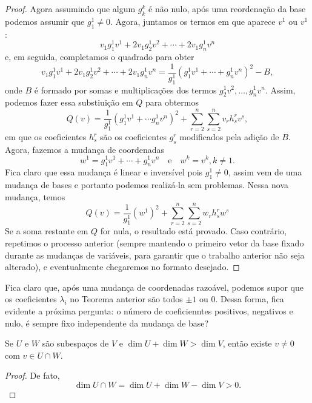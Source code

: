 \begin{proof}
    Agora assumindo que algum $g^k_k$ é não nulo, após uma reordenação da base podemos assumir que $g^1_1 \neq 0$. Agora, juntamos os termos em que aparece $v^1$ ou $v^1$: \begin{equation}
        v_1 g^1_1 v^1 + 2v_1g^1_2v^2 + \cdots + 2v_1 g^1_n v^n
    \end{equation} e, em seguida, completamos o quadrado para obter \begin{equation}
        v_1 g^1_1 v^1 + 2v_1g^1_2v^2 + \cdots + 2v_1 g^1_n v^n = \frac{1}{g^1_1}(g^1_1 v^1 + \cdots + g^1_n v^n)^2 - B,
    \end{equation} onde $B$ é formado por somas e multiplicações dos termos $g^1_2 v^2, \dots, g^1_n v^n$. Assim, podemos fazer essa substiuição em $Q$ para obtermos \begin{equation}
        Q(v) = \frac{1}{g^1_1}(g^1_1 v^1 + \cdots g^1_n v^n)^2 + \sum_{r = 2}^n \sum_{s = 2}^n v_r h^r_s v^s,
    \end{equation} em que os coeficientes $h^r_s$ são os coeficientes $g^r_s$ modificados pela adição de $B$. Agora, fazemos a mudança de coordenadas \begin{equation}
        w^1 = g^1_1 v^1 + \cdots + g^1_n v^n \quad \text{e} \quad w^k = v^k, k \neq 1.
    \end{equation} Fica claro que essa mudança é linear e inversível pois $g^1_1 \neq 0$, assim vem de uma mudança de bases e portanto podemos realizá-la sem problemas. Nessa nova mudança, temos \begin{equation}
        Q(v) = \frac{1}{g^1_1} (w^1)^2 + \sum_{r = 2}^n \sum_{s = 2}^n w_r h^r_s w^s
    \end{equation} Se a soma restante em $Q$ for nula, o resultado está provado. Caso contrário, repetimos o processo anterior (sempre mantendo o primeiro vetor da base fixado durante as mudanças de variáveis, para garantir que o trabalho anterior não seja alterado), e eventualmente chegaremos no formato desejado.
\end{proof}

Fica claro que, após uma mudança de coordenadas razoável, podemos supor que os coeficientes $\lambda_i$ no Teorema anterior são todos $\pm 1$ ou $0$. Dessa forma, fica evidente a próxima pergunta: o número de coeficienntes positivos, negativos e nulo, é sempre fixo independente da mudança de base?

\begin{lemma}
    Se $U$ e $W$ são subespaços de $V$ e $\dim U + \dim W > \dim V$, então existe $v \neq 0$ com $v \in U \cap W$.
\end{lemma}
\begin{proof}
    De fato, \begin{equation}
        \dim U \cap W = \dim U + \dim W - \dim V > 0.
    \end{equation}
\end{proof}

